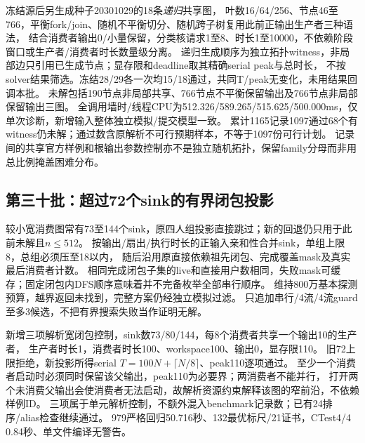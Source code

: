 \documentclass[UTF8,a4paper,11pt,fontset=fandol]{ctexart}
\begin{document}
冻结源后另生成种子20301029的18条\emph{递归}共享图，
叶数16/64/256、节点46至766，平衡fork/join、随机不平衡切分、随机跨子树复用此前正输出生产者三种语法，
结合消费者输出0/小量保留，分类核请求1至8、时长1至10000，不依赖阶段窗口或生产者/消费者时长数量级分离。
递归生成顺序为独立拓扑witness，非局部边只引用已生成节点；显存限和deadline取其精确serial peak与总时长，
不按solver结果筛选。冻结28/29各一次均15/18通过，共同T/peak无变化，未用结果回调本批。
未解包括190节点非局部共享、766节点不平衡保留输出及766节点非局部保留输出三图。
全调用墙时/线程CPU为512.326/\allowbreak{}589.265/\allowbreak{}515.625/\allowbreak{}500.000ms，仅单次诊断，新增输入整体独立模拟/提交模型一致。
累计1165记录1097通过68个有witness仍未解；通过数含原解析不可行预期样本，不等于1097份可行计划。
记录间的共享官方样例和根输出参数控制亦不是独立随机拓扑，保留family分母而非用总比例掩盖困难分布。

\subsection{第三十批：超过72个sink的有界闭包投影}
较小宽消费图常有73至144个sink，原四人组投影直接跳过；新的回退仍只用于此前未解且$n\le512$。
按输出/扇出/执行时长的正输入亲和性合并sink，单组上限8，总组必须压至18以内，
随后沿用原直接依赖祖先闭包、完成覆盖mask及真实最后消费者计数。
相同完成闭包子集的live和直接用户数相同，失败mask可缓存；固定闭包内DFS顺序意味着并不完备枚举全部串行顺序。
维持800万基本探测预算，越界返回未找到，完整方案仍经独立模拟过滤。
只追加串行/4流/4流guard至多3候选，不把有界搜索失败当作证明无解。

新增三项解析宽闭包控制，sink数73/80/144，每8个消费者共享一个输出10的生产者，
生产者时长1，消费者时长100、workspace100、输出0，显存限110。
旧72上限拒绝，新投影所得serial $T=100N+\lceil N/8\rceil$、peak110逐项通过。
至少一个消费者启动时必须同时保留该父输出，peak110为必要界；两消费者不能并行，
打开两个未消费父输出会使消费者无法启动，故解析资源约束解释该图的窄前沿，不依赖样例ID。
三项属于单元解析控制，不额外混入benchmark记录数；已有24排序/alias检查继续通过。
979严格回归50.716秒、132最优标尺/21证书，CTest4/4 0.84秒、单文件编译无警告。
\end{document}
